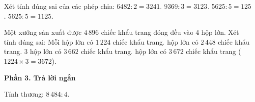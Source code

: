 \begin{ex} %
Xét tính đúng sai của các phép chia:
\choiceTF
{\True $6482 : 2 = 3241$.}
{\True $9369 : 3 = 3123$.}
{$5625 : 5 = 125$.}
{\True $5625 : 5 = 1125$.}
\end{ex}

\begin{ex} %
Một xưởng sản xuất được $4\,896$ chiếc khẩu trang đóng đều vào 4 hộp lớn. Xét tính đúng sai:
\choiceTF
{\True Mỗi hộp lớn có $1\,224$ chiếc khẩu trang.}
{ hộp lớn có $2\,448$ chiếc khẩu trang.}
{3 hộp lớn có $3\,662$ chiếc khẩu trang.}
{ hộp lớn có $3\,672$ chiếc khẩu trang ($1224 \times 3 = 3672$).}
\end{ex}

\textbf{Phần 3. Trả lời ngắn}

\begin{ex} %
Tính thương: $8\,484 : 4$.
\end{ex}

